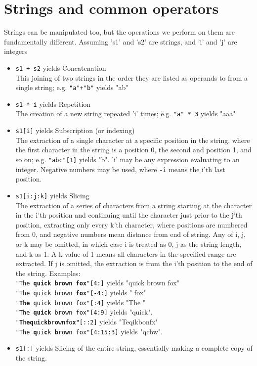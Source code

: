 \section{Strings and common operators}

Strings can be manipulated too, but the operations we perform on   them are fundamentally different. Assuming 's1' and 's2' are strings,   and 'i' and 'j' are integers
\begin{itemize}
	\item 
\texttt{s1 + s2} yields Concatenation
\\    This joining of two strings in the order they are listed as operands    to from a single string; e.g. 
\texttt{"a"+"b"} yields "ab"
	\item 
\texttt{s1 * i} yields Repetition
\\    The creation of a new string repeated 'i' times; e.g. 
\texttt{"a" *    3} yields "aaa"
	\item 
\texttt{s1[i]} yields Subscription (or indexing)
\\    The extraction of a single character at a specific position in the    string, where the first character in the string is a position 0,    the second and position 1, and so on; e.g. 
\texttt{"abc"[1]}    yields "b". 'i' may be any expression evaluating to an integer.    Negative numbers may be used, where 
\texttt{-i} means the i'th    last position.
	\item 
\texttt{s1[i:j:k]} yields Slicing
\\    The extraction of a series of characters from a string starting at    the character in the i'th position and continuing until the    character just prior to the j'th position, extracting only every    k'th character, where positions are numbered from 0, and negative    numbers mean distance from end of string. Any of i, j, or k may be    omitted, in which case i is treated as 0, j as the string length, and    k as 1.  A k value of 1 means all characters in the    specified range are extracted. If j is omitted, the extraction is    from the i'th position to the end of the string.  Examples:
\\
\texttt{"The \textbf{quick brown fox}"[4:]} yields "quick brown fox"
\\
\texttt{"The quick brown\textbf{ fox}"[-4:]} yields " fox"
\\
\texttt{"\textbf{The }quick brown fox"[:4]} yields "The "
\\
\texttt{"The \textbf{quick} brown fox"[4:9]} yields "quick".
\\
\texttt{"\textbf{T}h\textbf{e}\textbf{q}u\textbf{i}c\textbf{k}\textbf{b}r\textbf{o}w\textbf{n}\textbf{f}o\textbf{x}"[::2]} yields "Teqikbonfx"
\\
\texttt{"The \textbf{q}ui\textbf{c}k \textbf{b}ro\textbf{w}n fox"[4:15:3]} yields "qcbw".
\\
	\item 
\texttt{s1[:]} yields Slicing of the entire string,    essentially making a complete copy of the string.
\end{itemize}


